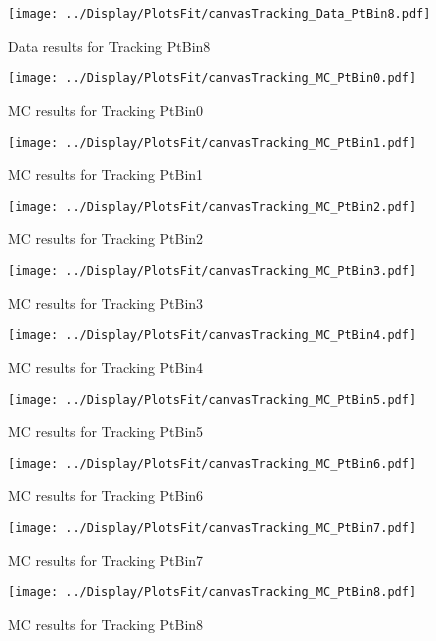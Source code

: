 \documentclass{article}
\begin{document}
\begin{figure}
    \texttt{[image: ../Display/PlotsFit/canvasTracking\_Data\_PtBin8.pdf]}
    \caption{Data results for Tracking PtBin8 }
\end{figure}


\begin{figure}
    \texttt{[image: ../Display/PlotsFit/canvasTracking\_MC\_PtBin0.pdf]}
    \caption{MC results for Tracking PtBin0 }
\end{figure}

\begin{figure}
    \texttt{[image: ../Display/PlotsFit/canvasTracking\_MC\_PtBin1.pdf]}
    \caption{MC results for Tracking PtBin1 }
\end{figure}

\begin{figure}
    \texttt{[image: ../Display/PlotsFit/canvasTracking\_MC\_PtBin2.pdf]}
    \caption{MC results for Tracking PtBin2 }
\end{figure}

\begin{figure}
    \texttt{[image: ../Display/PlotsFit/canvasTracking\_MC\_PtBin3.pdf]}
    \caption{MC results for Tracking PtBin3 }
\end{figure}

\begin{figure}
    \texttt{[image: ../Display/PlotsFit/canvasTracking\_MC\_PtBin4.pdf]}
    \caption{MC results for Tracking PtBin4 }
\end{figure}

\begin{figure}
    \texttt{[image: ../Display/PlotsFit/canvasTracking\_MC\_PtBin5.pdf]}
    \caption{MC results for Tracking PtBin5 }
\end{figure}

\begin{figure}
    \texttt{[image: ../Display/PlotsFit/canvasTracking\_MC\_PtBin6.pdf]}
    \caption{MC results for Tracking PtBin6 }
\end{figure}

\begin{figure}
    \texttt{[image: ../Display/PlotsFit/canvasTracking\_MC\_PtBin7.pdf]}
    \caption{MC results for Tracking PtBin7 }
\end{figure}

\begin{figure}
    \texttt{[image: ../Display/PlotsFit/canvasTracking\_MC\_PtBin8.pdf]}
    \caption{MC results for Tracking PtBin8 }
\end{figure}
\end{document}
